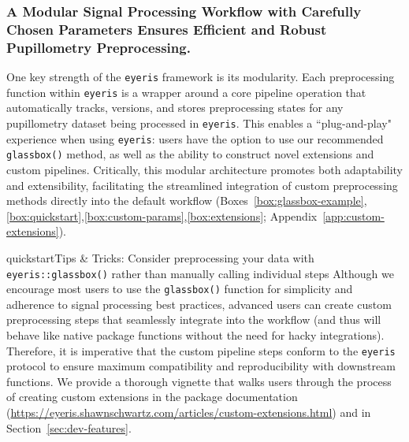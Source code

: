 \subsubsection{A Modular Signal Processing Workflow with Carefully Chosen Parameters Ensures Efficient and Robust Pupillometry Preprocessing.}

One key strength of the \texttt{eyeris} framework is its modularity. Each preprocessing function within \texttt{eyeris} is a wrapper around a core pipeline operation that automatically tracks, versions, and stores preprocessing states for any pupillometry dataset being processed in \texttt{eyeris}. This enables a ``plug-and-play" experience when using \texttt{eyeris}: users have the option to use our recommended \texttt{glassbox()} method, as well as the ability to construct novel extensions and custom pipelines. Critically, this modular architecture promotes both adaptability and extensibility, facilitating the streamlined integration of custom preprocessing methods directly into the default workflow (Boxes~\ref{box:glassbox-example},\ref{box:quickstart},\ref{box:custom-params},\ref{box:extensions}; Appendix~\ref{app:custom-extensions}).

\begin{eyerisbox}{quickstart}{Tips \& Tricks: Consider preprocessing your data with \texttt{eyeris::glassbox()} rather than manually calling individual steps}
Although we encourage most users to use the \texttt{glassbox()} function for simplicity and adherence to signal processing best practices, advanced users can create custom preprocessing steps that seamlessly integrate into the workflow (and thus will behave like native package functions without the need for hacky integrations). Therefore, it is imperative that the custom pipeline steps conform to the \texttt{eyeris} protocol to ensure maximum compatibility and reproducibility with downstream functions. We provide a thorough vignette that walks users through the process of creating custom extensions in the package documentation (\url{https://eyeris.shawnschwartz.com/articles/custom-extensions.html}) and in Section~\ref{sec:dev-features}.
\end{eyerisbox}

